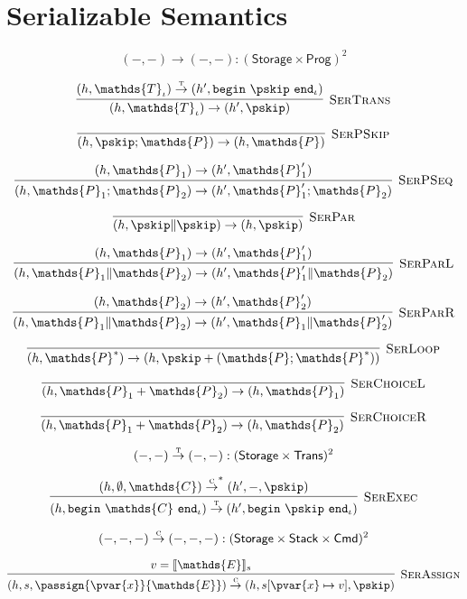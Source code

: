 \section{Serializable Semantics}

\[
(-, -) \rightarrow (-, -) : (\mathsf{Storage} \times \mathsf{Prog})^2
\]

\[
\infer[\textsc{SerTrans}]
{
	(h, \mathds{T}_\iota) \rightarrow (h', \pskip)
}
{
	(h, \mathds{T}_\iota) \overset{\textsc{t}}{\rightarrow} (h', \mathtt{begin}\ \pskip\ \mathtt{end}_\iota)
}
\]

\[
\infer[\textsc{SerPSkip}]
{
	(h, \pskip ; \mathds{P}) \rightarrow (h, \mathds{P})
}
{}
\]

\[
\infer[\textsc{SerPSeq}]
{
	(h, \mathds{P}_1 ; \mathds{P}_2) \rightarrow (h', \mathds{P}_1' ; \mathds{P}_2)
}
{
	(h, \mathds{P}_1) \rightarrow (h', \mathds{P}_1')
}
\]

\[
\infer[\textsc{SerPar}]
{
	(h, \pskip \| \pskip) \rightarrow (h, \pskip)
}
{}
\]

\[
\infer[\textsc{SerParL}]
{
	(h, \mathds{P}_1 \| \mathds{P}_2) \rightarrow (h', \mathds{P}_1' \| \mathds{P}_2)
}
{
	(h, \mathds{P}_1) \rightarrow (h', \mathds{P}_1')
}
\]

\[
\infer[\textsc{SerParR}]
{
	(h, \mathds{P}_1 \| \mathds{P}_2) \rightarrow (h', \mathds{P}_1 \| \mathds{P}_2')
}
{
	(h, \mathds{P}_2) \rightarrow (h', \mathds{P}_2')
}
\]

\[
\infer[\textsc{SerLoop}]
{
	(h, \mathds{P}^*)
	\rightarrow
	(h, \pskip + (\mathds{P} ; \mathds{P}^*))
}
{}
\]

\[
\infer[\textsc{SerChoiceL}]
{
	(h, \mathds{P}_1 + \mathds{P}_2)
	\rightarrow
	(h, \mathds{P}_1)
}
{}
\]

\[
\infer[\textsc{SerChoiceR}]
{
	(h, \mathds{P}_1 + \mathds{P}_2)
	\rightarrow
	(h, \mathds{P}_2)
}
{}
\]

\[
(-, -) \overset{\textsc{t}}{\rightarrow} (-, -) : (\mathsf{Storage} \times \mathsf{Trans})^2
\]

\[
\infer[\textsc{SerExec}]
{
	(h, \mathtt{begin}\ \mathds{C}\ \mathtt{end}_\iota) \overset{\textsc{t}}{\rightarrow} (h', \mathtt{begin}\ \pskip\ \mathtt{end}_\iota)
}
{
	(h, \emptyset, \mathds{C}) \overset{\textsc{c}}{\rightarrow}^* (h', -, \pskip)
}
\]

\[
(-, -, -) \overset{\textsc{c}}{\rightarrow} (-, -, -) : (\mathsf{Storage} \times \mathsf{Stack} \times \mathsf{Cmd})^2
\]

\[
\infer[\textsc{SerAssign}]
{
	(h, s, \passign{\pvar{x}}{\mathds{E}})
	\overset{\textsc{c}}{\rightarrow}
	(h, s[\pvar{x} \mapsto v], \pskip)
}
{
	v = \llbracket \mathds{E} \rrbracket_s
}
\]

